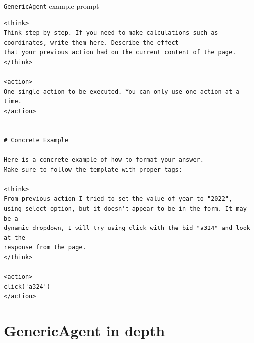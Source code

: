 \documentclass[10pt]{article} %
\newcommand{\code}[1]{\texttt{#1}}
\begin{document}
\begin{AgentPrompt}{\code{GenericAgent} example prompt}
\begin{tiny}
\begin{verbatim}
<think>
Think step by step. If you need to make calculations such as coordinates, write them here. Describe the effect
that your previous action had on the current content of the page.
</think>

<action>
One single action to be executed. You can only use one action at a time.
</action>


# Concrete Example

Here is a concrete example of how to format your answer.
Make sure to follow the template with proper tags:

<think>
From previous action I tried to set the value of year to "2022",
using select_option, but it doesn't appear to be in the form. It may be a
dynamic dropdown, I will try using click with the bid "a324" and look at the
response from the page.
</think>

<action>
click('a324')
</action>
\end{verbatim}
\end{tiny}
\end{AgentPrompt}

\section{GenericAgent in depth}

\newcommand{\yes}{{\color{green}\ding{51}}}
\newcommand{\no}{{\color{red}\ding{55}}}
\end{document}
